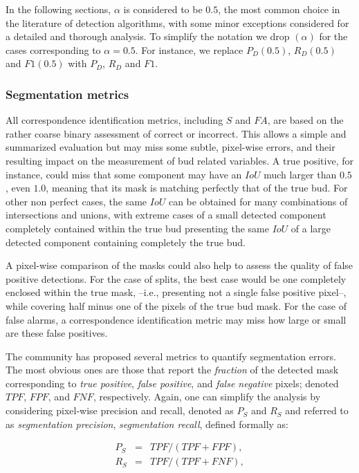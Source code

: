 \documentclass[a4paper,authoryear,review]{elsarticle}
\begin{document}
	In the following sections, $\alpha$ is considered to be $0.5$, the most common choice in the literature of detection algorithms, with some minor exceptions considered for a detailed and thorough analysis. To simplify the notation we drop $(\alpha)$ for the cases corresponding to $\alpha=0.5$. For instance, we replace $P_D(0.5)$, $R_D(0.5)$ and $F1(0.5)$ with $P_D$, $R_D$ and $F1$.
	
	
	\subsubsection{Segmentation metrics}
	\label{subsec:segmetrics}
	
	
	All correspondence identification metrics, including $S$ and $FA$, are based on the rather coarse binary assessment of correct or incorrect. This allows a simple and summarized evaluation but may miss some subtle, pixel-wise errors, and their resulting impact on the measurement of bud related variables. 
	A true positive, for instance, could miss that some component may have an $IoU$ much larger than $0.5$, even $1.0$, meaning that its mask is matching perfectly that of the true bud. 
	For other non perfect cases, the same $IoU$ can be obtained for many combinations of intersections and unions, with extreme cases of a small detected component completely contained within the true bud presenting the same $IoU$ of a large detected component containing completely the true bud.
	
	A pixel-wise comparison of the masks could also help to assess the quality of false positive detections. For the case of splits, the best case would be one completely enclosed within the true mask, --i.e., presenting not a single false positive pixel--, while covering half minus one of the pixels of the true bud mask. 
	For the case of false alarms, a correspondence identification metric may miss how large or small are these false positives. 
	
	The community has proposed several metrics to quantify segmentation errors. The most obvious ones are those that report the \emph{fraction} of the detected mask corresponding to \emph{true positive}, \emph{false positive}, and \emph{false negative} pixels; denoted $TPF$, $FPF$, and $FNF$, respectively. Again, one can simplify the analysis by considering pixel-wise precision and recall, denoted as $P_S$ and $R_S$ and referred to as \emph{segmentation precision}, \emph{segmentation recall}, defined formally as: 
	
	\begin{eqnarray*} 
		P_S &=& TPF / (TPF + FPF),\\
		R_S &=& TPF / (TPF + FNF),
	\end{eqnarray*}
	
\end{document}
